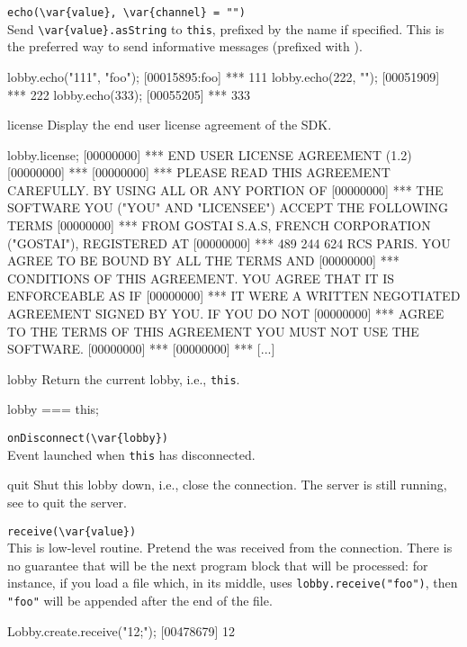\begin{urbiscriptapi}
\item \lstinline|echo(\var{value}, \var{channel} = "")|\\
  Send \lstinline|\var{value}.asString| to \lstinline|this|, prefixed
  by the   name if specified.  This is
  the preferred way to send informative messages (prefixed with
  \samp{***}).
\begin{urbiscript}
lobby.echo("111", "foo");
[00015895:foo] *** 111
lobby.echo(222, "");
[00051909] *** 222
lobby.echo(333);
[00055205] *** 333
\end{urbiscript}


\item[license]
  Display the end user license agreement of the \urbi SDK.
\begin{urbiunchecked}
lobby.license;
[00000000] *** END USER LICENSE AGREEMENT (1.2)
[00000000] ***
[00000000] *** PLEASE READ THIS AGREEMENT CAREFULLY.  BY USING ALL OR ANY PORTION OF
[00000000] *** THE SOFTWARE YOU ("YOU" AND "LICENSEE") ACCEPT THE FOLLOWING TERMS
[00000000] *** FROM GOSTAI S.A.S, FRENCH CORPORATION ("GOSTAI"), REGISTERED AT
[00000000] *** 489 244 624 RCS PARIS.  YOU AGREE TO BE BOUND BY ALL THE TERMS AND
[00000000] *** CONDITIONS OF THIS AGREEMENT.  YOU AGREE THAT IT IS ENFORCEABLE AS IF
[00000000] *** IT WERE A WRITTEN NEGOTIATED AGREEMENT SIGNED BY YOU.  IF YOU DO NOT
[00000000] *** AGREE TO THE TERMS OF THIS AGREEMENT YOU MUST NOT USE THE SOFTWARE.
[00000000] ***
[00000000] *** [...]
\end{urbiunchecked}

\item[lobby]
  Return the current lobby, i.e., \lstinline|this|.
\begin{urbiassert}
lobby === this;
\end{urbiassert}

\item \lstinline|onDisconnect(\var{lobby})|\\
  Event launched when \lstinline|this| has disconnected.

\item[quit] Shut this lobby down, i.e., close the connection.  The
  server is still running, see  to quit the
  server.

\item \lstinline|receive(\var{value})|\\
  This is low-level routine.  Pretend the 
   was received from the connection.  There is no guarantee
  that  will be the next program block that will be
  processed: for instance, if you load a file which, in its middle,
  uses \lstinline|lobby.receive("foo")|, then \lstinline|"foo"| will
  be appended after the end of the file.
\begin{urbiscript}
Lobby.create.receive("12;");
[00478679] 12
\end{urbiscript}


\end{urbiscriptapi}
